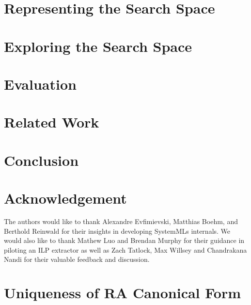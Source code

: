 \documentclass{article}
\begin{document}
\section{Representing the Search Space} \label{sec:la:to:ra}


\section{Exploring the Search Space} \label{explore}


\section{Evaluation} \label{sec:evaluation}


\section{Related Work}


% 

\section{Conclusion}


\section{Acknowledgement}
The authors would like to thank Alexandre Evfimievski, Matthias Boehm, and Berthold Reinwald for their insights in developing SystemMLs internals. We would also like to thank Mathew Luo and Brendan Murphy for their guidance in piloting an ILP extractor as well as Zach Tatlock, Max Willsey and Chandrakana Nandi for their valuable feedback and discussion.

\balance




\newpage

\appendix
\section{Uniqueness of RA Canonical Form}
\end{document}
